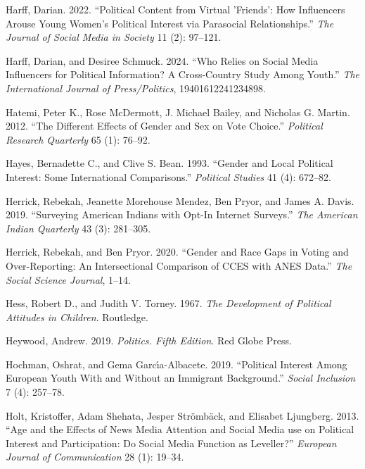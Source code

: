\documentclass[
  letterpaper,
  DIV=11,
  numbers=noendperiod]{scrreprt}
\newlength{\cslhangindent}
\newenvironment{CSLReferences}[2] %
 {\begin{list}{}{%
  \setlength{\itemindent}{0pt}
  \setlength{\leftmargin}{0pt}
  \setlength{\parsep}{0pt}
  \ifodd #1
   \setlength{\leftmargin}{\cslhangindent}
   \setlength{\itemindent}{-1\cslhangindent}
  \fi
  \setlength{\itemsep}{#2\baselineskip}}}
 {\end{list}}
\begin{document}
\begin{CSLReferences}{1}{0}
Harff, Darian. 2022. {``{Political Content from Virtual 'Friends': How
Influencers Arouse Young Women's Political Interest via Parasocial
Relationships}.''} \emph{The Journal of Social Media in Society} 11 (2):
97--121.

Harff, Darian, and Desiree Schmuck. 2024. {``{Who Relies on Social Media
Influencers for Political Information? A Cross-Country Study Among
Youth}.''} \emph{The International Journal of Press/Politics},
19401612241234898.

Hatemi, Peter K., Rose McDermott, J. Michael Bailey, and Nicholas G.
Martin. 2012. {``{The Different Effects of Gender and Sex on Vote
Choice}.''} \emph{Political Research Quarterly} 65 (1): 76--92.

Hayes, Bernadette C., and Clive S. Bean. 1993. {``{Gender and Local
Political Interest: Some International Comparisons}.''} \emph{Political
Studies} 41 (4): 672--82.

Herrick, Rebekah, Jeanette Morehouse Mendez, Ben Pryor, and James A.
Davis. 2019. {``{Surveying American Indians with Opt-In Internet
Surveys}.''} \emph{The American Indian Quarterly} 43 (3): 281--305.

Herrick, Rebekah, and Ben Pryor. 2020. {``{Gender and Race Gaps in
Voting and Over-Reporting: An Intersectional Comparison of CCES with
ANES Data}.''} \emph{The Social Science Journal}, 1--14.

Hess, Robert D., and Judith V. Torney. 1967. \emph{{The Development of
Political Attitudes in Children}}. Routledge.

Heywood, Andrew. 2019. \emph{{Politics. Fifth Edition}}. Red Globe
Press.

Hochman, Oshrat, and Gema Garcı́a-Albacete. 2019. {``{Political Interest
Among European Youth With and Without an Immigrant Background}.''}
\emph{Social Inclusion} 7 (4): 257--78.

Holt, Kristoffer, Adam Shehata, Jesper Strömbäck, and Elisabet
Ljungberg. 2013. {``{Age and the Effects of News Media Attention and
Social Media use on Political Interest and Participation: Do Social
Media Function as Leveller?}''} \emph{European Journal of Communication}
28 (1): 19--34.


\end{CSLReferences}
\end{document}
